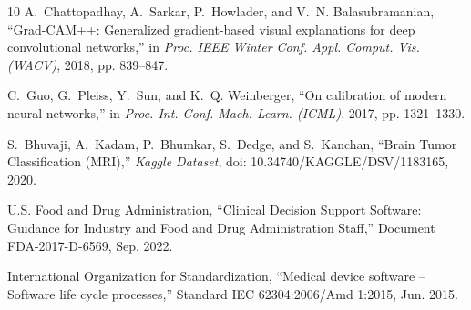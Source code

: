 \documentclass[journal,twocolumn,10pt]{IEEEtran}
\begin{document}
\begin{thebibliography}{10}
A.~Chattopadhay, A.~Sarkar, P.~Howlader, and V.~N. Balasubramanian, ``Grad-CAM++: Generalized gradient-based visual explanations for deep convolutional networks,'' in \emph{Proc. IEEE Winter Conf. Appl. Comput. Vis. (WACV)}, 2018, pp. 839--847.

C.~Guo, G.~Pleiss, Y.~Sun, and K.~Q. Weinberger, ``On calibration of modern neural networks,'' in \emph{Proc. Int. Conf. Mach. Learn. (ICML)}, 2017, pp. 1321--1330.

S.~Bhuvaji, A.~Kadam, P.~Bhumkar, S.~Dedge, and S.~Kanchan, ``Brain Tumor Classification (MRI),'' \emph{Kaggle Dataset}, doi: 10.34740/KAGGLE/DSV/1183165, 2020.

U.S. Food and Drug Administration, ``Clinical Decision Support Software: Guidance for Industry and Food and Drug Administration Staff,'' Document FDA-2017-D-6569, Sep. 2022.

International Organization for Standardization, ``Medical device software -- Software life cycle processes,'' Standard IEC 62304:2006/Amd 1:2015, Jun. 2015.

\end{thebibliography}
\end{document}
